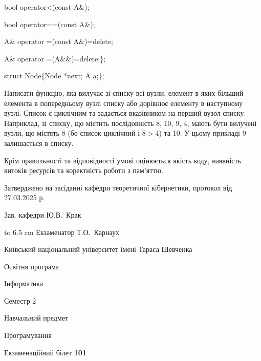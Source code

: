 \documentclass[12pt, ukrainian]{article}
\begin{document}
{\quad  bool operator<(const A\&); 

\quad  bool operator==(const A\&); 

\quad A\& operator =(const A\&)=delete; 

\quad  A\& operator =(A\&\&)=delete;\};

struct Node\{Node *next; A a;\};

 Написати функцію, яка вилучає зі списку всі вузли, елемент в яких більший елемента в попередньому вузлі списку або дорівнює елементу в наступному вузлі. Список є циклічним та задається вказівником на перший вузол списку. Наприклад, зі списку, що містить послідовність 8, 10, 9, 4, мають бути вилучені вузли, що містять 8 (бо список циклічний і $8>4$) та 10. У цьому прикладі 9 залишається в списку.

Крім правильності та відповідності умові оцінюється якість коду, наявність витоків ресурсів та коректність роботи з пам'яттю. 

}
{\smallskip\smallskip \begin {scriptsize} Затверджено на засіданні кафедри теоретичної кібернетики, протокол   від   27.03.2025 р.\par\smallskip\smallskip\smallskip\smallskip
{\parbox {6.5 cm} {Зав. кафедри \dotfill Ю.В.~Крак}}\hspace {0.7cm} {\hbox to 6.5 cm { Екзаменатор \dotfill Т.О.~Карнаух}} \end{scriptsize}}
\newpage
{{\begin {scriptsize}\par
{ \center  Київський національний університет імені Тараса Шевченка \par}
{\parbox {5 cm}{Освітня програма \hfill}{\parbox {7 cm}{Інформатика\hfill}}\parbox {6 cm}{\hfill Семестр 2}}\par
{\parbox {5 cm} {Навчальний предмет \hfill}\parbox {7 cm}{Програмування \hfill}\parbox {6cm}{\hfill}\par}\vspace{-15pt} \end{scriptsize}}{\center Екзаменаційний білет \No \textbf { 101 }\par}}
\end{document}
